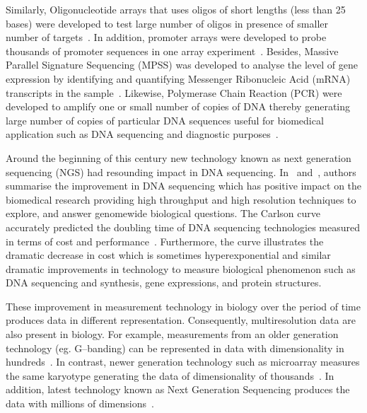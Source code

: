 Similarly, Oligonucleotide arrays that uses oligos of short lengths 
(less than 25 bases) were developed to test large number of oligos 
in presence of smaller number of targets~\cite{lockhart96}. In 
addition, promoter arrays were developed to probe thousands of 
promoter sequences in one array experiment~\cite{wang2005}. 
Besides, Massive Parallel Signature Sequencing (MPSS) was developed
to analyse the level of gene expression by identifying and quantifying 
Messenger Ribonucleic Acid (mRNA) transcripts in the sample~\cite{brenner2000mpss}. 
Likewise, Polymerase Chain Reaction (PCR) were developed to amplify
one or small number of copies of DNA thereby generating large number 
of copies of particular DNA sequences useful for biomedical application
such as DNA sequencing and diagnostic purposes~\cite{pcr2003}.

Around the beginning of this century new technology known as next 
generation sequencing (NGS) had resounding impact in DNA sequencing. 
In~\cite{mardis08} and~\cite{mardis2011}, authors summarise 
the improvement in DNA sequencing which has positive impact on the 
biomedical research providing high throughput and high resolution 
techniques to explore, and answer genomewide biological questions. 
The Carlson curve accurately predicted the doubling time of DNA sequencing 
technologies measured in terms of cost and performance~\cite{carlson2003}.
Furthermore, the curve illustrates the dramatic decrease in cost which is 
sometimes hyperexponential and similar dramatic improvements in technology
to measure biological phenomenon such as DNA sequencing and synthesis, 
gene expressions, and protein structures.

These improvement in measurement technology in biology over the 
period of time produces data in different representation. 
Consequently, multiresolution data are also present 
in biology. For example, measurements from an older generation
technology (eg. G--banding) can be represented in data with
dimensionality in hundreds~\cite{benn1992,shaffer05}. 
In contrast, newer generation technology such as 
microarray measures the same karyotype generating the
data of dimensionality of thousands~\cite{kallioniemi92,pinkel98}. 
In addition, latest technology known as Next Generation Sequencing 
produces the data with millions of dimensions~\cite{mardis08,roh10com}.

